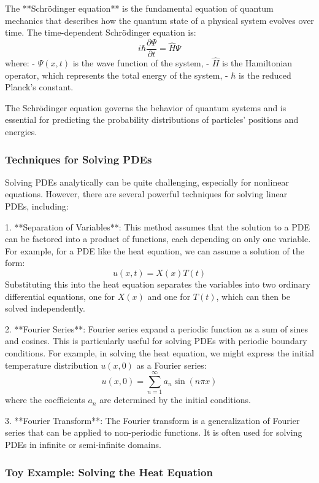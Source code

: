 \documentclass{article}
\begin{document}
The **Schrödinger equation** is the fundamental equation of quantum mechanics that describes how the quantum state of a physical system evolves over time. The time-dependent Schrödinger equation is:
\[
i \hbar \frac{\partial \Psi}{\partial t} = \hat{H} \Psi
\]
where:
- \( \Psi(x, t) \) is the wave function of the system,
- \( \hat{H} \) is the Hamiltonian operator, which represents the total energy of the system,
- \( \hbar \) is the reduced Planck’s constant.

The Schrödinger equation governs the behavior of quantum systems and is essential for predicting the probability distributions of particles' positions and energies.

\subsubsection*{Techniques for Solving PDEs}

Solving PDEs analytically can be quite challenging, especially for nonlinear equations. However, there are several powerful techniques for solving linear PDEs, including:

1. **Separation of Variables**:
   This method assumes that the solution to a PDE can be factored into a product of functions, each depending on only one variable. For example, for a PDE like the heat equation, we can assume a solution of the form:
   \[
   u(x, t) = X(x)T(t)
   \]
   Substituting this into the heat equation separates the variables into two ordinary differential equations, one for \( X(x) \) and one for \( T(t) \), which can then be solved independently.

2. **Fourier Series**:
   Fourier series expand a periodic function as a sum of sines and cosines. This is particularly useful for solving PDEs with periodic boundary conditions. For example, in solving the heat equation, we might express the initial temperature distribution \( u(x, 0) \) as a Fourier series:
   \[
   u(x, 0) = \sum_{n=1}^{\infty} a_n \sin(n\pi x)
   \]
   where the coefficients \( a_n \) are determined by the initial conditions.

3. **Fourier Transform**:
   The Fourier transform is a generalization of Fourier series that can be applied to non-periodic functions. It is often used for solving PDEs in infinite or semi-infinite domains.

\subsubsection*{Toy Example: Solving the Heat Equation}
\end{document}

